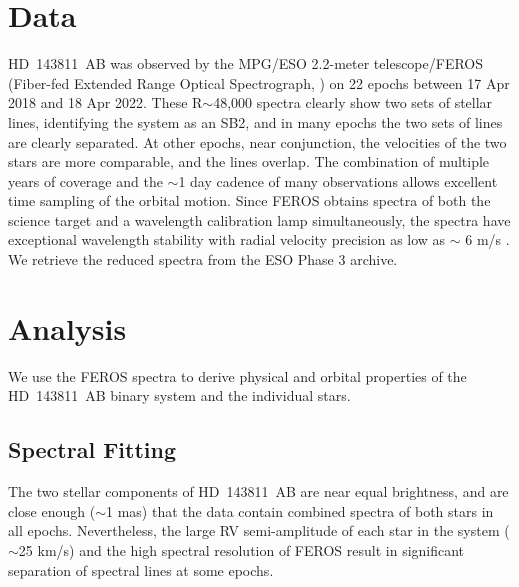 \documentclass[]{aastex701} %
\begin{document}

\section{Data}

HD~143811~AB was observed by the MPG/ESO 2.2-meter telescope/FEROS (Fiber-fed Extended Range Optical Spectrograph, \citealt{kaufner:1999}) on 22 epochs between 17 Apr 2018 and 18 Apr 2022.  These R$ \sim$48,000 spectra clearly show two sets of stellar lines, identifying the system as an SB2, and in many epochs the two sets of lines are clearly separated. At other epochs, near conjunction, the velocities of the two stars are more comparable, and the lines overlap.  The combination of multiple years of coverage and the $\sim$1 day cadence of many observations allows excellent time sampling of the orbital motion. Since FEROS obtains spectra of both the science target and a wavelength calibration lamp simultaneously, the spectra have exceptional wavelength stability with radial velocity precision as low as $\sim$ 6 m/s \citep{zakhozhay:2022}. We retrieve the reduced spectra from the ESO Phase 3 archive.



\section{Analysis}

We use the FEROS spectra to derive physical and orbital properties of the HD~143811~AB binary system and the individual stars. 

\subsection{Spectral Fitting}


The two stellar components of HD~143811~AB are near equal brightness, and are close enough ($\sim$1 mas) that the data contain combined spectra of both stars in all epochs. Nevertheless, the large RV semi-amplitude of each star in the system ($\sim$25 km/s) and the high spectral resolution of FEROS result in significant separation of spectral lines at some epochs.
\end{document}
